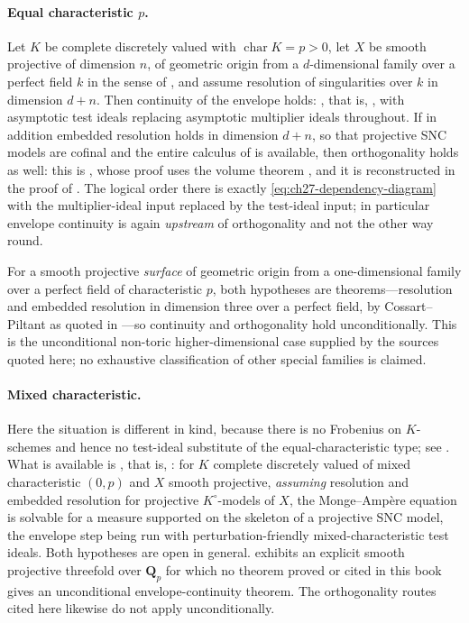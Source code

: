 \paragraph{Equal characteristic $p$.}
Let $K$ be complete discretely valued with
$\operatorname{char}K=p>0$, let $X$ be smooth projective of dimension
$n$, of geometric origin from a $d$-dimensional family over a perfect
field $k$ in the sense of , and assume
resolution of singularities over $k$ in dimension $d+n$.  Then
continuity of the envelope holds:
, that is,
\cite[Theorem~8.2]{GJKM19}, with asymptotic test ideals replacing asymptotic
multiplier ideals throughout.  If in addition embedded resolution holds in
dimension $d+n$, so that projective SNC models are cofinal and the entire
calculus of  is available,
then orthogonality holds as well: this is
\cite[Theorem~9.2]{GJKM19}, whose proof uses the volume theorem
\cite[Theorem~6.3.2]{BGGJKM20}, and it is reconstructed in the proof of
.  The logical order there is
exactly \eqref{eq:ch27-dependency-diagram} with the multiplier-ideal input
replaced by the test-ideal input; in particular envelope continuity is
again \emph{upstream} of orthogonality and not the other way round.

For a smooth projective \emph{surface} of geometric origin from a
one-dimensional family over a perfect field of characteristic $p$, both
hypotheses are theorems---resolution and embedded resolution in dimension
three over a perfect field, by Cossart--Piltant as quoted in
---so continuity and orthogonality hold
unconditionally.  This is the unconditional non-toric higher-dimensional case supplied by
the sources quoted here; no exhaustive classification of other special
families is claimed.

\paragraph{Mixed characteristic.}
Here the situation is different in kind, because there is no Frobenius on
$K$-schemes and hence no test-ideal substitute of the equal-characteristic
type; see .  What is available is
, that is, \cite{FGK25}: for $K$
complete discretely valued of mixed characteristic $(0,p)$ and $X$
smooth projective, \emph{assuming} resolution and embedded resolution for
projective $K^\circ$-models of $X$, the Monge--Amp\`ere equation is
solvable for a measure supported on the skeleton of a projective SNC model,
the envelope step being run with perturbation-friendly mixed-characteristic
test ideals.  Both hypotheses are open in general.
 exhibits an explicit smooth projective
threefold over $\mathbf Q_p$ for which no theorem proved or cited in this
book gives an unconditional envelope-continuity theorem.  The
orthogonality routes cited here likewise do not apply unconditionally.

